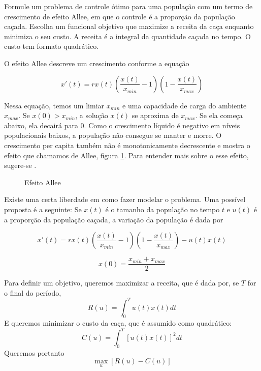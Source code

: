 \begin{example}
    Formule um problema de controle ótimo para uma população com um termo de
    crescimento de efeito Allee, em que o controle é a proporção da população
    caçada. Escolha um funcional objetivo que maximize a receita da caça
    enquanto minimiza o seu custo. A receita é a integral da quantidade caçada
    no tempo. O custo tem  formato quadrático. 
\end{example}

O efeito Allee descreve um crescimento conforme a equação 

\begin{equation}
    x'(t) = rx(t)\left(\frac{x(t)}{x_{min}} - 1\right)\left(1 - \frac{x(t)}{x_{max}}\right)
\end{equation}

Nessa equação, temos um limiar $x_{min}$ e uma capacidade de carga do ambiente
$x_{max}$. Se $x(0) > x_{min}$, a solução $x(t)$ se aproxima de $x_{max}$. Se ela começa
abaixo, ela decairá para 0. Como o crescimento líquido é negativo em níveis
populacionais baixos, a população não consegue se manter e morre. O
crescimento per capita também não é monotonicamente decrescente e mostra o
efeito que chamamos de Allee, figura \ref{Fig1:allee-effect}. Para entender
mais sobre o esse efeito, sugere-se \cite{kot2001elements}. 

\begin{figure}[!ht]
    \center
    
    \caption{Efeito Allee}
    \label{Fig1:allee-effect}
\end{figure}

Existe uma certa liberdade em como fazer modelar o problema. Uma possível
proposta é a seguinte: Se $x(t)$ é o tamanho da população no tempo $t$ e
$u(t)$ é a proporção da população caçada, a variação da população é dada por

$$
x'(t) = rx(t)\left(\frac{x(t)}{x_{min}} - 1\right)\left(1 - \frac{x(t)}{x_{max}}\right) - u(t)x(t)
$$

$$x(0) = \frac{x_{min} + x_{max}}{2}$$

Para definir um objetivo, queremos maximizar a receita, que é dada por, se $T$
for o final do período,
$$
R(u) = \int_0^T u(t)x(t)dt
$$
E queremos minimizar o custo da caça, que é assumido como quadrático: 
$$
C(u) = \int_0^T [u(t)x(t)]^2dt
$$
Queremos portanto 
$$
\max_u [R(u) - C(u)]
$$